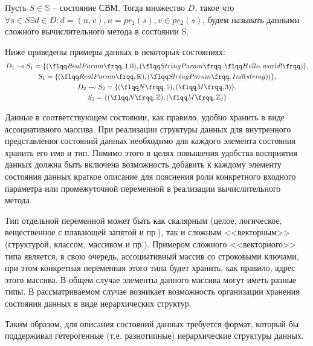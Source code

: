 \begin{definition}
    \label{def:CCMData}
    Пусть \(S\in\mathbb{S}\) -- состояние СВМ. Тогда множество \(D\), такое что \(\forall s \in S \exists d \in D : d = (n,v), n = pr_1(s), v \in pr_2(s)\),
    будем называть данными сложного вычислительного метода в состоянии S.
\end{definition}

Ниже приведены примеры данных в некоторых состояниях:
\begin{gather*}
    D_1 \multimap S_1 = \{(\flqq RealParam \frqq, 1.0), (\flqq StringParam \frqq, \flqq Hello, world! \frqq)\}, \\
    S_1=\{(\flqq RealParam \frqq, \mathbb{R}),(\flqq StringParam \frqq, Ind(string))\},                         \\
    D_2 \multimap S_2 = \{(\flqq N \frqq, 5), (\flqq M \frqq, 3)\},                                             \\
    S_2 = \{(\flqq N \frqq, \mathbb{Z}), (\flqq M \frqq, \mathbb{Z})\}
\end{gather*}

Данные в соответствующем состоянии, как правило, удобно хранить в виде ассоциативного массива. При реализации структуры данных для внутренного представления состояний данных необходимо для каждого элемента состояния хранить его имя и тип. Помимо этого в целях повышения удобства восприятия данных должна быть включена возможность добавить к каждому элементу состояния данных краткое описание для пояснения роли конкретного входного параметра или промежуточной переменной в реализации вычислительного метода.

Тип отдельной переменной может быть как скалярным (целое, логическое, вещественное с плавающей запятой и пр.), так и сложным <<векторным>> (структурой, классом, массивом и пр.). Примером сложного <<векторного>> типа является, в свою очередь, ассоциативный массив со строковыми ключами, при этом конкретная переменная этого типа будет хранить, как правило, адрес этого массива. В общем случае элементы данного массива могут иметь разные типы. В рассматриваемом случае возникает возможность организации хранения состояния данных в виде иерархических структур.

Таким образом, для описания состояний данных требуется формат, который бы поддерживал гетерогенные (т.е. разнотипные) иерархические структуры данных.


